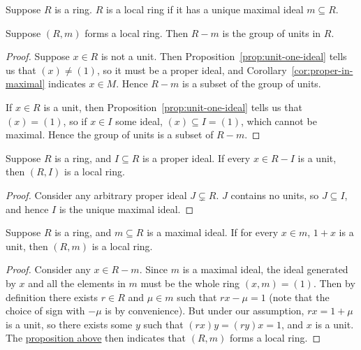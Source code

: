 \begin{definition}
    Suppose \(R\) is a ring.
    \(R\) is a local ring if it has a unique maximal ideal \(m \subseteq R\).
\end{definition}
\begin{theorem}
    Suppose \((R,m)\) forms a local ring.
    Then \(R-m\) is the group of units in \(R\).
\end{theorem}
\begin{proof}
    Suppose \(x \in R\) is not a unit.
    Then Proposition~\ref{prop:unit-one-ideal} tells us that \((x) \neq (1)\),
    so it must be a proper ideal,
    and Corollary~\ref{cor:proper-in-maximal} indicates \(x \in M\).
    Hence \(R-m\) is a subset of the group of units.

    If \(x \in R\) is a unit,
    then Proposition~\ref{prop:unit-one-ideal} tells us that \((x) = (1)\),
    so if \(x \in I\) some ideal, \((x) \subseteq I = (1)\),
    which cannot be maximal.
    Hence the group of units is a subset of \(R-m\).
\end{proof}
\begin{proposition}\label{prop:local-ring-units}
    Suppose \(R\) is a ring, and \(I \subseteq R\) is a proper ideal.
    If every \(x \in R-I\) is a unit, then \((R,I)\) is a local ring.
\end{proposition}
\begin{proof}
    Consider any arbitrary proper ideal \(J \subsetneq R\).
    \(J\) contains no units, so \(J \subseteq I\),
    and hence \(I\) is the unique maximal ideal.
\end{proof}
\begin{proposition}
    Suppose \(R\) is a ring, and \(m \subseteq R\) is a maximal ideal.
    If for every \(x \in m\), \(1+x\) is a unit, then \((R,m)\) is a local ring.
\end{proposition}
\begin{proof}
    Consider any \(x \in R-m\).
    Since \(m\) is a maximal ideal,
    the ideal generated by \(x\) and all the elements in \(m\)
    must be the whole ring \((x,m) = (1)\).
    Then by definition there exists \(r \in R\) and \(\mu \in m\) such that \(rx-\mu = 1\)
    (note that the choice of sign with \(-\mu\) is by convenience).
    But under our assumption, \(rx = 1+\mu\) is a unit,
    so there exists some \(y\) such that \((rx)y = (ry)x = 1\),
    and \(x\) is a unit.
    The \hyperref[prop:local-ring-units]{proposition above}
    then indicates that \((R,m)\) forms a local ring.
\end{proof}

